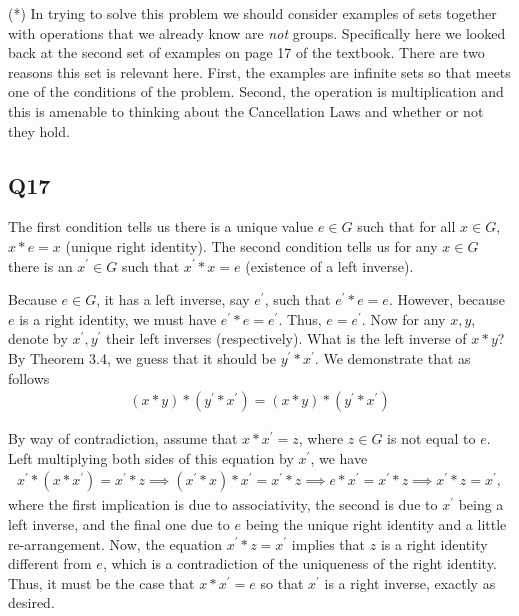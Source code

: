 \documentclass[12pt]{article}
\numberwithin{theorem}{section}
\numberwithin{equation}{section}
\numberwithin{remark}{section}
\numberwithin{definition}{section}
\numberwithin{theorem}{section}
\numberwithin{lemma}{section}
\numberwithin{example}{section}
\begin{document}
\vspace{\baselineskip}

\noindent (*) In trying to solve this problem we should consider examples of sets together with operations that we already know are \emph{not} groups. Specifically here we looked back at the second set of examples on page 17 of the textbook. There are two reasons this set is relevant here. First, the examples are infinite sets so that meets one of the conditions of the problem. Second, the operation is multiplication and this is amenable to thinking about the Cancellation Laws and whether or not they hold. 



\subsection{Q17}

The first condition tells us there is a unique value $e\in G$ such that for all $x\in G$, $x*e=x$ (unique right identity). The second condition tells us for any $x\in G$ there is an $x^\prime\in G$ such that $x^\prime * x = e$ (existence of a left inverse). 


Because $e\in G$, it has a left inverse, say $e^\prime$, such that $e^\prime * e = e$. However, because $e$ is a right identity, we must have $e^\prime*e=e^\prime$. Thus, $e=e^\prime$. Now for any $x,y$, denote by $x^\prime,y^\prime$ their left inverses (respectively). What is the left inverse of $x*y$? By Theorem 3.4, we guess that it should be $y^\prime * x^\prime$. We demonstrate that as follows
\begin{align*}
	(x*y)*(y^\prime * x^\prime)=(x*y)*(y^\prime * x^\prime)
\end{align*}

By way of contradiction, assume that $x*x^\prime = z$, where $z\in G$ is not equal to $e$. Left multiplying both sides of this equation by $x^\prime$, we have
\begin{align*}
	x^\prime*(x*x^\prime) = x^\prime*z \implies (x^\prime*x)*x^\prime = x^\prime*z \implies e*x^\prime = x^\prime* z \implies x^\prime * z = x^\prime,
\end{align*}
where the first implication is due to associativity, the second is due to $x^\prime$ being a left inverse, and the final one due to $e$ being the unique right identity and a little re-arrangement. Now, the equation $x^\prime * z = x^\prime$ implies that $z$ is a right identity different from $e$, which is a contradiction of the uniqueness of the right identity. Thus, it must be the case that $x*x^\prime = e$ so that $x^\prime$ is a right inverse, exactly as desired. 
\end{document}
